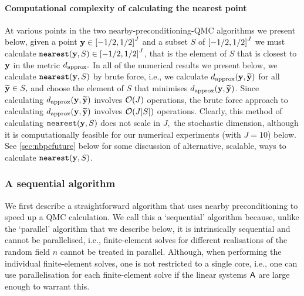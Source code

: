 \paragraph{Computational complexity of calculating the nearest point} At various points in the two nearby-preconditioning-QMC algorithms we present below, given a point $\by \in \cube{J}$ and a subset $S$ of $\cube{J}$ we must calculate $\nearest(\by,S) \in \cube{J}$, that is the element of $S$ that is closest to $\mathbf{y}$ in the metric $d_{\mathrm{approx}}.$ In all of the numerical results we present below, we calculate $\mathtt{nearest}(\mathbf{y},S)$ by brute force, i.e., we calculate $d_{\mathrm{approx}}(\mathbf{y},\widetilde{\mathbf{y}})$ for all $\widetilde{\mathbf{y}} \in S,$ and choose the element of $S$ that minimises $d_{\mathrm{approx}}(\mathbf{y},\widetilde{\mathbf{y}})$. Since calculating $d_{\mathrm{approx}}(\mathbf{y},\widetilde{\mathbf{y}})$ involves $\cO\mleft(J\mright)$ operations, the brute force approach to calculating $d_{\mathrm{approx}}(\mathbf{y},\widetilde{\mathbf{y}})$ involves $\cO\mleft(J\abs{S}\mright)$ operations. Clearly, this method of calculating $\mathtt{nearest}(\mathbf{y},S)$ does not scale in $J,$ the stochastic dimension, although it is computationally feasible for our numerical experiments (with $J=10$) below. See \cref{sec:nbpcfuture} below for some discussion of alternative, scalable, ways to calculate $\mathtt{nearest}(\mathbf{y},S)$.

\subsubsection{A sequential algorithm}
We first describe a straightforward algorithm that uses nearby preconditioning to speed up a QMC calculation. We call this a `sequential' algorithm because, unlike the `parallel' algorithm that we describe below, it is intrinsically sequential and cannot be parallelised, i.e., finite-element solves for different realisations of the random field $n$ cannot be treated in parallel. Although, when performing the individual finite-element solves, one is not restricted to a single core, i.e., one can use parallelisation for each finite-element solve  if the linear systems $\mathsf{A}$ are large enough to warrant this.

